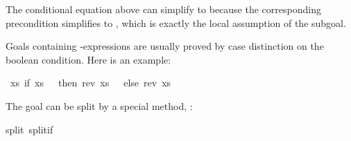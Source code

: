 \begin{isabellebody}
\isadelimproof
%
\endisadelimproof
%
\isatagproof
%
\endisatagproof
{\isafoldproof}%
%
\isadelimproof
%
\endisadelimproof
%
\begin{isamarkuptext}%
\noindent
The conditional equation  above
can simplify  to 
because the corresponding precondition 
simplifies to , which is exactly the local
assumption of the subgoal.%
\end{isamarkuptext}%
\isamarkuptrue%
%
\isamarkuptrue%
%
\begin{isamarkuptext}%
\label{sec:AutoCaseSplits}%
Goals containing -expressions
are usually proved by case
distinction on the boolean condition.  Here is an example:%
\end{isamarkuptext}%
\isamarkuptrue%
\isamarkupfalse%
\ {}{}xs{}\ if\ xs\ {}\ {}{}\ then\ rev\ xs\ {}\ {}{}\ else\ rev\ xs\ {}\ {}{}{}%
\isadelimproof
%
\endisadelimproof
%
\isatagproof
%
\begin{isamarkuptxt}%
\noindent
The goal can be split by a special method, :%
\end{isamarkuptxt}%
\isamarkuptrue%
\isamarkupfalse%
{}split\ split{}if{}%
\begin{isamarkuptxt}%
\noindent
\begin{isabelle}%

\end{isabelle}
\end{isamarkuptxt}
\end{isabellebody}
